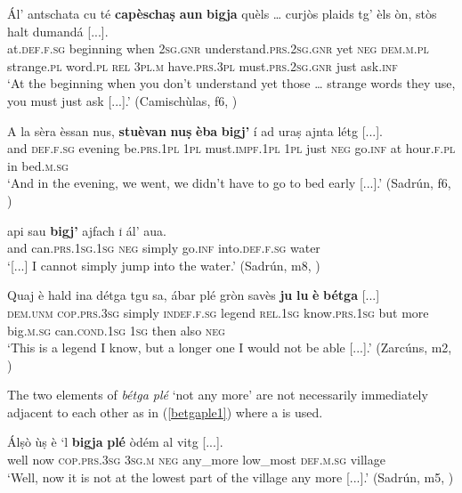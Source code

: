 \ea
\label{ex:negbetg6}
\gll    Ál’ antschata cu té \textbf{capèschaṣ} \textbf{aun} \textbf{bigja} quèls … curjòs plaids tg’ èls òn, stòs halt dumandá [...].\\
at.\textsc{def.f.sg} beginning when \textsc{2sg.gnr} understand.\textsc{prs.2sg.gnr} yet \textsc{neg} \textsc{dem.m.pl} {} strange.\textsc{pl} word.\textsc{pl} \textsc{rel} \textsc{3pl.m} have.\textsc{prs.3pl} must.\textsc{prs.2sg.gnr} just ask.\textsc{inf}\\
\glt `At the beginning when you don’t understand yet those … strange words they use, you must just ask [...].' (Camischùlas, f6, )
\z

\ea
\label{ex:negbetg7}
\gll    A la sèra èssan nus, \textbf{stuèvan} \textbf{nuṣ} \textbf{èba} \textbf{bigj’} í ad uraṣ ajnta létg [...].\\
and \textsc{def.f.sg} evening be.\textsc{prs.1pl} \textsc{1pl} must.\textsc{impf.1pl} \textsc{1pl} just \textsc{neg} go.\textsc{inf} at hour.\textsc{f.pl} in  bed.\textsc{m.sg}\\
\glt `And in the evening, we went, we didn’t have to go to bed early [...].' (Sadrún, f6, )
\z

\ea\label{ex:negbetg8}
\gll  [...] api sau \textbf{bigj’} ajfach \textsc{í} ál’ aua.\\
{} and can.\textsc{prs.1sg.1sg} \textsc{neg} simply go.\textsc{inf} into.\textsc{def.f.sg} water\\
\medskip
\glt `[...] I cannot simply jump into the water.' (Sadrún, m8, )
\z

\ea
\label{ex:negbetg9}
\gll    Quaj è hald ina détga tgu sa, ábar plé gròn savès \textbf{ju} \textbf{lu} \textbf{è} \textbf{bétga} [...]\\
\textsc{dem.unm} \textsc{cop.prs.3sg} simply \textsc{indef.f.sg} legend \textsc{rel.1sg} know.\textsc{prs.1sg} but more big.\textsc{m.sg} can.\textsc{cond.1sg} \textsc{1sg} then also \textsc{neg}\\
\glt `This is a legend I know, but a longer one I would not be able [...].' (Zarcúns, m2, )
\z

The two elements of \textit{bétga plé} `not any more' are not necessarily immediately adjacent to each other as in (\ref{betgaple1}) where a  is used.

\ea
\label{betgaple1}
\gll  Álṣò ùṣ è `l \textbf{bigja} \textbf{plé} òdém al vitg [...]. \\
well now  \textsc{cop.prs.3sg} \textsc{3sg.m} \textsc{neg} any\_more low\_most \textsc{def.m.sg} village\\
\glt `Well, now it is not at the lowest part of the village any more [...].' (Sadrún, m5, )
\z

